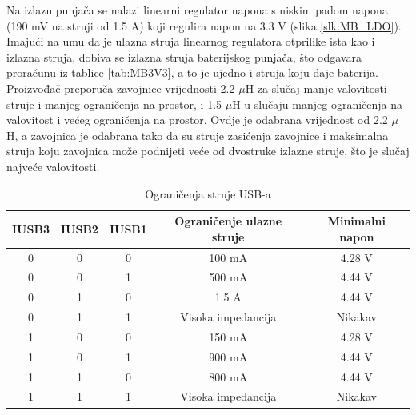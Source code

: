 Na izlazu punjača se nalazi linearni regulator napona s niskim padom napona (190 mV na struji od 1.5 A) koji regulira napon na 3.3 V (slika \ref{slk:MB_LDO}). Imajući na umu da je ulazna struja linearnog regulatora otprilike ista kao i izlazna struja, dobiva se izlazna struja baterijskog punjača, što odgavara proračunu iz tablice \ref{tab:MB3V3}, a to je ujedno i struja koju daje baterija. Proizvođač preporuča zavojnice vrijednosti 2.2 $\mu$H za slučaj manje valovitosti struje i manjeg ograničenja na prostor, i 1.5 $\mu$H u slučaju manjeg ograničenja na valovitost i većeg ograničenja na prostor. Ovdje je odabrana vrijednost od 2.2 $\mu$H, a zavojnica je odabrana tako da su struje zasićenja zavojnice i maksimalna struja koju zavojnica može podnijeti veće od dvostruke izlazne struje, što je slučaj najveće valovitosti.
\begin{table}[!htb]
    \centering
    \caption{Ograničenja struje USB-a \cite{ti:bq24166}}
    \begin{tabular}{|c|c|c|c|c|} \hline
    IUSB3 & IUSB2 & IUSB1 & Ograničenje ulazne struje & Minimalni napon \\
    \hline
    0 & 0 & 0 & 100 mA & 4.28 V \\
    \hline
    0 & 0 & 1 & 500 mA & 4.44 V \\
    \hline
    0 & 1 & 0 & 1.5 A & 4.44 V \\
    \hline
    0 & 1 & 1 & Visoka impedancija & Nikakav \\
    \hline
    1 & 0 & 0 & 150 mA & 4.28 V \\
    \hline
    1 & 0 & 1 & 900 mA & 4.44 V \\
    \hline
    1 & 1 & 0 & 800 mA & 4.44 V \\
    \hline
    1 & 1 & 1 & Visoka impedancija & Nikakav \\
    \hline
    \end{tabular}%
    \label{tab:USB_ILIM}%
\end{table}%

